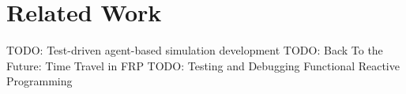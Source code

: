 \section{Related Work}
TODO: Test-driven agent-based simulation development \cite{collier_test-driven_2013}
TODO: Back To the Future: Time Travel in FRP \cite{perez_back_2017}
TODO: Testing and Debugging Functional Reactive Programming \cite{perez_testing_2017}
